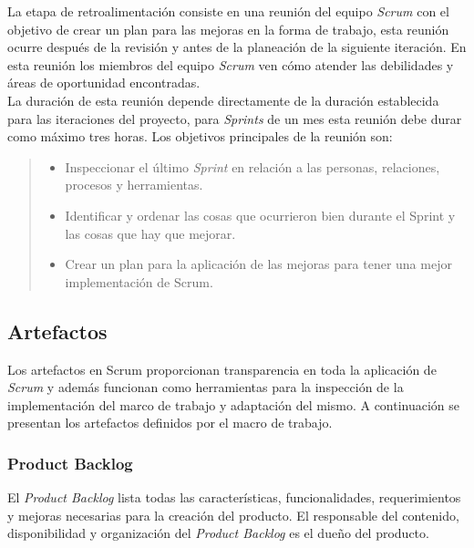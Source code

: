  La etapa de retroalimentación consiste en una reunión del equipo {\it Scrum} con el objetivo de
 crear un plan para las mejoras en la forma de trabajo, esta reunión ocurre después de la revisión
 y antes de la planeación de la siguiente iteración. En esta reunión los miembros del equipo
 {\it Scrum} ven cómo atender las debilidades y áreas de oportunidad encontradas.\\

 \noindent La duración de esta reunión depende directamente de la duración 
 establecida para las iteraciones del proyecto, para {\it Sprints} de un mes esta 
 reunión debe durar como máximo tres horas. Los objetivos principales de la reunión 
 son:

    \begin{quote}
    \begin{itemize}
    \item Inspeccionar el último {\it Sprint} en relación a las personas, relaciones,
            procesos y herramientas.

    \item Identificar y ordenar las cosas que ocurrieron bien durante el Sprint y las
            cosas que hay que mejorar.

    \item Crear un plan para la aplicación de las mejoras para tener una mejor implementación
            de Scrum.
    \end{itemize}
    \end{quote}

\subsection{Artefactos}

 Los artefactos en Scrum proporcionan transparencia en toda la aplicación de {\it Scrum}
 y además funcionan como herramientas para la inspección de la implementación del
 marco de trabajo y adaptación del mismo. A continuación se presentan los artefactos
 definidos por el macro de trabajo.


\subsubsection{Product Backlog}

 El {\it Product Backlog} lista todas las características, funcionalidades, 
 requerimientos y mejoras necesarias para la creación del producto. El responsable 
 del contenido, disponibilidad y organización del {\it Product Backlog} es el dueño
 del producto.\\

